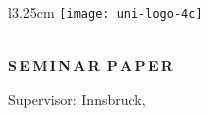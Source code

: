 \frontmatter
\pagestyle{empty}

\begin{titlepage}
\rule{0mm}{1mm}
\vspace*{10mm}
\begin{wrapfigure}{l}{3.25cm}
    \texttt{[image: uni-logo-4c]}
\end{wrapfigure}
\begin{flushright}
    \setlength{\unitlength}{1cm}
    {\large \MOrg \vskip 5mm
    \MInstitution}\\
    \textbf{\large \MGroup}
    \vskip 15mm
    \textbf{\Large S\,E\,M\,I\,N\,A\,R\,\,\,P\,A\,P\,E\,R}
\end{flushright}

\begin{center}
    \vskip 25mm
    {\LARGE\bf \MTitle}
    \vskip 5mm
    \vskip 1cm
    {\large \textbf{\MAuthor}}\vskip 15mm
    \vskip 2cm
    {\large Supervisor: \MSupervisor}
    \vfill
    {\large Innsbruck, \MDate} 
\end{center}
\end{titlepage} 

\ClearShipoutPicture
